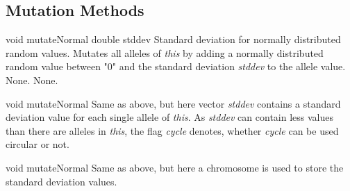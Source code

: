 \subsection{Mutation Methods}

\setNormalInstance
\printMethodWithOneParam
{void}
{mutateNormal}
{double}
{stddev}
{Standard deviation for normally distributed random values.}
{Mutates all alleles of {\em this} by adding a normally distributed
 random value between "0" and the standard deviation {\em stddev}
 to the allele value.}
{None.}
{None.}

\clearpage

\setNormalInstance
\setCorrectWidthThree{8pt}
\printMethodWithParamsSaved
{void}
{}
{mutateNormal}
{Same as above, but here vector {\em stddev} contains a
 standard deviation value for each single allele of {\em this}.
 As {\em stddev} can contain less values than there are alleles in 
 {\em this}, the flag {\em cycle} denotes, whether {\em cycle}
 can be used circular or not.}
{}
\setCorrectWidthThree{4pt}

\vspace*{4ex}

\setNormalInstance
\setCorrectWidthThree{8pt}
\printMethodWithParamsSaved
{void}
{}
{mutateNormal}
{Same as above, but here a chromosome is used to store the
 standard deviation values.}
{}
\setCorrectWidthThree{4pt}

